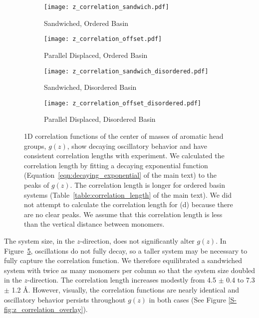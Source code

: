   \begin{figure}[!htb]
  \centering
  \begin{subfigure}{0.45\textwidth}
  \centering
  \texttt{[image: z\_correlation\_sandwich.pdf]}
  \caption{Sandwiched, Ordered Basin}\label{S-fig:z_correlation_sandwich}
  \end{subfigure}  
  \begin{subfigure}{0.45\textwidth}
  \centering
  \texttt{[image: z\_correlation\_offset.pdf]}
  \caption{Parallel Displaced, Ordered Basin}\label{S-fig:z_correlation_offset}
  \end{subfigure}  
  \begin{subfigure}{0.45\textwidth}
  \centering
  \texttt{[image: z\_correlation\_sandwich\_disordered.pdf]}
  \caption{Sandwiched, Disordered Basin}\label{S-fig:z_correlation_sandwich_disordered}
  \end{subfigure}  
  \begin{subfigure}{0.45\textwidth}
  \centering
  \texttt{[image: z\_correlation\_offset\_disordered.pdf]}
  \caption{Parallel Displaced, Disordered Basin}\label{S-fig:z_correlation_offset_disordered}
  \end{subfigure}  
  \caption{1D correlation functions of the center of masses of aromatic head
	  groups, $g(z)$, show decaying oscillatory behavior and have consistent
	  correlation lengths with experiment. We calculated the correlation length by
	  fitting a decaying exponential function
	  (Equation~\ref{eqn:decaying_exponential} of the main text) to the peaks of $g(z)$. The
	  correlation length is longer for ordered basin systems
	  (Table~\ref{table:correlation_length} of the main text). We did not attempt to calculate the
	  correlation length for (d) because there are no clear peaks. We assume that
	  this correlation length is less than the vertical distance between
	  monomers.}\label{S-fig:correlation}
  \end{figure} 

  The system size, in the $z$-direction, does not significantly alter $g(z)$.
  In Figure~\ref{S-fig:correlation}, oscillations do not fully decay, so a taller
  system may be necessary to fully capture the correlation function. We therefore
  equilibrated a sandwiched system with twice as many monomers per column so that
  the system size doubled in the $z$-direction. The correlation length increases
  modestly from 4.5 $\pm$ 0.4 to 7.3 $\pm$ 1.2 \AA. However, visually, the
  correlation functions are nearly identical and oscillatory behavior persists
  throughout $g(z)$ in both cases (See Figure \ref{S-fig:z_correlation_overlay}).
  
